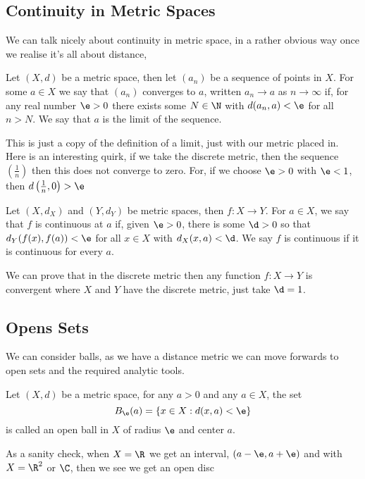 \subsection{Continuity in Metric Spaces}
We can talk nicely about continuity in metric space, in a rather obvious way once we realise it's all about distance,
\begin{ndefi}[Limit]
  Let $(X, d)$ be a metric space, then let $(a_n)$ be a sequence of points in $X$. For some $a \in X$ we say that $(a_n)$ converges to $a$, written $a_n \to a$ as $n \to \infty$ if, for any real number $\e > 0$ there exists some $N \in \N$ with $d(a_n, a) < \e$ for all $n > N$. We say that $a$ is the limit of the sequence.
\end{ndefi}

\noindent
This is just a copy of the definition of a limit, just with our metric placed in. Here is an interesting quirk, if we take the discrete metric, then the sequence $\left( \frac{1}{n} \right)$ then this does not converge to zero. For, if we choose $\e > 0$ with $\e < 1$, then $d\left(\frac{1}{n}, 0 \right) > \e$

\begin{ndefi}[Continuity]
  Let $(X, d_X)$ and $(Y, d_Y)$ be metric spaces, then $f : X \to Y$. For $a \in X$, we say that $f$ is continuous at $a$ if, given $\e > 0$, there is some $\d > 0$ so that $d_Y(f(x), f(a)) < \e$ for all $x \in X$ with $d_X(x, a) < \d$. We say $f$ is continuous if it is continuous for every $a$.
\end{ndefi}

We can prove that in the discrete metric then any function $f : X \to Y$ is convergent where $X$ and $Y$ have the discrete metric, just take $\d = 1$.

\subsection{Opens Sets}
We can consider balls, as we have a distance metric we can move forwards to open sets and the required analytic tools.
\begin{ndefi}
  Let $(X, d)$ be a metric space, for any $a > 0$ and any $a \in X$, the set
  $$ B_\e (a) = \{x \in X : d(x, a) < \e\} $$
  is called an open ball in $X$ of radius $\e$ and center $a$.
\end{ndefi}

\noindent
As a sanity check, when $X = \R$ we get an interval, $(a - \e, a + \e)$
and with $X = \R^2$ or $\C$, then we see we get an open disc

